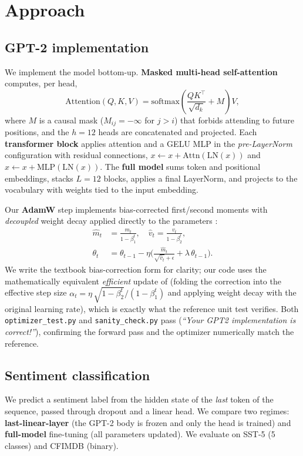 \documentclass[10pt,twocolumn]{article}
\begin{document}
\section{Approach}
\subsection{GPT-2 implementation}
\label{sec:gpt2}
We implement the model bottom-up. \textbf{Masked multi-head self-attention}
computes, per head,
\begin{equation}
\mathrm{Attention}(Q,K,V)=\mathrm{softmax}\!\left(\frac{QK^{\top}}{\sqrt{d_k}}+M\right)V,
\end{equation}
where $M$ is a causal mask ($M_{ij}=-\infty$ for $j>i$) that forbids attending to
future positions, and the $h{=}12$ heads are concatenated and projected. Each
\textbf{transformer block} applies attention and a GELU MLP in the
\emph{pre-LayerNorm} configuration with residual connections,
$x \leftarrow x + \mathrm{Attn}(\mathrm{LN}(x))$ and
$x \leftarrow x + \mathrm{MLP}(\mathrm{LN}(x))$. The \textbf{full model} sums token
and positional embeddings, stacks $L{=}12$ blocks, applies a final LayerNorm, and
projects to the vocabulary with weights tied to the input embedding.

Our \textbf{AdamW} step implements bias-corrected first/second moments with
\emph{decoupled} weight decay applied directly to the parameters
\cite{loshchilov2019decoupled}:
\begin{align}
\hat m_t &= \tfrac{m_t}{1-\beta_1^t}, \quad \hat v_t = \tfrac{v_t}{1-\beta_2^t},\\
\theta_t &= \theta_{t-1} - \eta\Big(\tfrac{\hat m_t}{\sqrt{\hat v_t}+\epsilon}
+ \lambda\,\theta_{t-1}\Big).
\end{align}
We write the textbook bias-correction form for clarity; our code uses the
mathematically equivalent \emph{efficient} update of
\cite{loshchilov2019decoupled} (folding the correction into the effective step
size $\alpha_t=\eta\,\sqrt{1-\beta_2^t}/(1-\beta_1^t)$ and applying weight decay
with the original learning rate), which is exactly what the reference unit test
verifies.
Both \texttt{optimizer\_test.py} and \texttt{sanity\_check.py} pass
(\emph{``Your GPT2 implementation is correct!''}), confirming the forward pass and
the optimizer numerically match the reference.

\subsection{Sentiment classification}
We predict a sentiment label from the hidden state of the \emph{last} token of
the sequence, passed through dropout and a linear head. We compare two regimes:
\textbf{last-linear-layer} (the GPT-2 body is frozen and only the head is
trained) and \textbf{full-model} fine-tuning (all parameters updated). We
evaluate on SST-5 (5 classes) \cite{socher2013recursive} and CFIMDB (binary).
\end{document}

